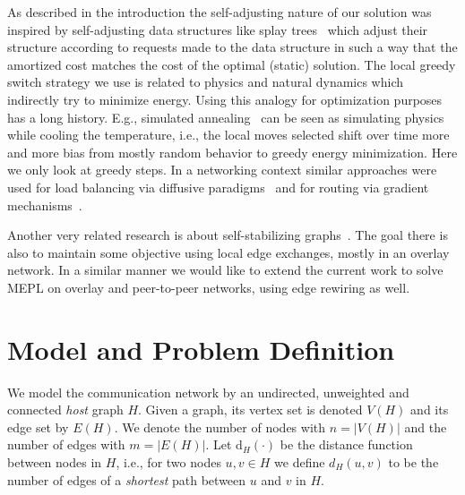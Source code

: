 \documentclass[conference]{IEEEtran}
\newcommand{\card}[1]{\lvert #1\rvert}
\def\d{\mathrm{d}}
\begin{document}
As described in the introduction the self-adjusting nature of our solution was inspired by self-adjusting data structures like splay trees~\cite{sleator1985self} which adjust their structure according to requests made to the data structure in such a way that the amortized cost matches the cost of the optimal (static) solution. The local greedy switch strategy we use is related to physics and natural dynamics which indirectly try to minimize energy. Using this analogy for optimization purposes has a long history. E.g., simulated annealing~\cite{kirkpatrick1983optimization} can be seen as simulating physics while cooling the temperature, i.e., the local moves selected shift over time more and more bias from mostly random behavior to greedy energy minimization. Here we only look at greedy steps. 
In a networking context similar approaches were used for load balancing via diffusive paradigms~\cite{rabani1998local} and for routing via gradient mechanisms~\cite{PhysRevE.77.036121}.

Another very related research is about self-stabilizing graphs~\cite{jacob2009distributed,jacob2009self}. The goal there is also to maintain some objective using local edge exchanges,
mostly in an overlay network. In a similar manner we would like to extend the current work to solve MEPL on overlay and peer-to-peer networks, using edge rewiring as well.

























%
 
\section{Model and Problem Definition} \label{sec:model}
We model the communication network by an undirected, unweighted and connected \emph{host} graph $H$. 
Given a graph, its vertex set is denoted $V(H)$ and its edge set by $E(H)$. We denote the number of nodes with $n = \card{V(H)}$ and the number of edges with $m = \card{E(H)}$. Let $\d_H(\cdot)$ be the distance function between nodes in $H$, i.e., for two nodes $u,v \in H$ we define $d_H(u,v)$ to be the number of edges of a \emph{shortest} path between $u$ and $v$ in $H$. 
\end{document}
